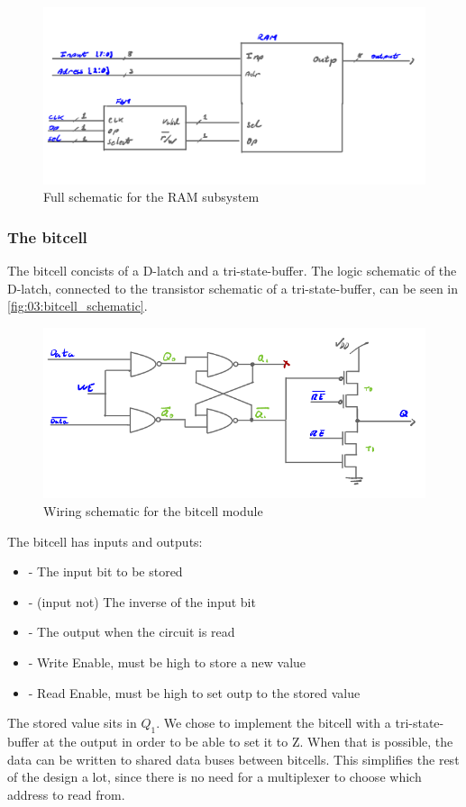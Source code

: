 \begin{figure}
    \centering
    \includegraphics[width=0.5\linewidth]{LaTeX_2/Figures/memory_block_schematic.png}
    \caption{Full schematic for the RAM subsystem}
    \label{fig:03:RAM_schematic}
\end{figure}


\subsubsection{The bitcell}
The bitcell concists of a D-latch and a tri-state-buffer. The logic schematic of the D-latch, connected to the transistor schematic of a tri-state-buffer, can be seen in \autoref{fig:03:bitcell_schematic}.

\begin{figure}
    \centering
    \includegraphics[width=0.8\linewidth]{LaTeX_2/Figures/bitcell.png}
    \caption{Wiring schematic for the bitcell module}
    \label{fig:03:bitcell_schematic}
\end{figure}

The bitcell has inputs and outputs:
\begin{itemize}
    \item {} - The input bit to be stored
    \item {} - (input not) The inverse of the input bit
    \item {} - The output when the circuit is read
    \item {} - Write Enable, must be high to store a new value
    \item {} - Read Enable, must be high to set outp to the stored value
\end{itemize}
The stored value sits in $Q_1$. We chose to implement the bitcell with a tri-state-buffer at the output in order to be able to set it to Z. When that is possible, the data can be written to shared data buses between bitcells. This simplifies the rest of the design a lot, since there is no need for a multiplexer to choose which address to read from.

